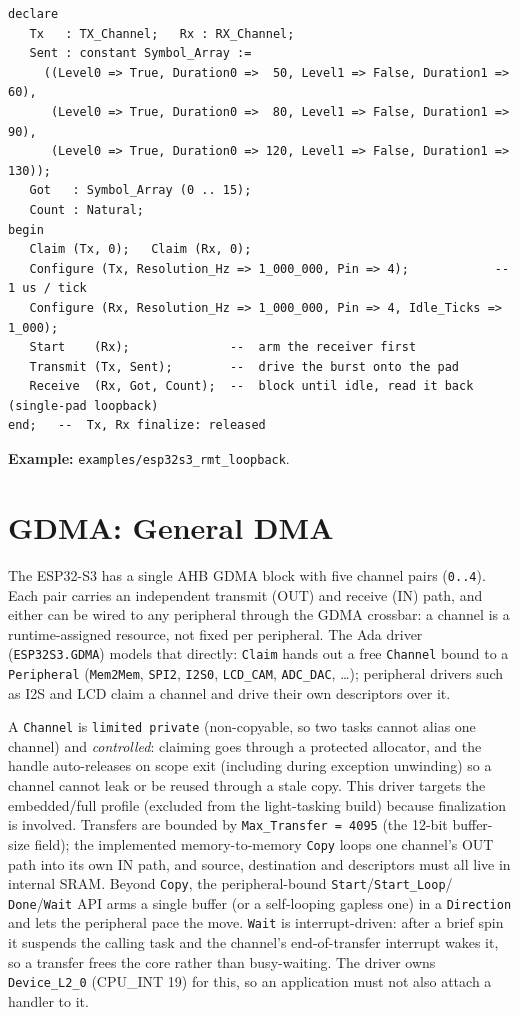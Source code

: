 \begin{lstlisting}
declare
   Tx   : TX_Channel;   Rx : RX_Channel;
   Sent : constant Symbol_Array :=
     ((Level0 => True, Duration0 =>  50, Level1 => False, Duration1 =>  60),
      (Level0 => True, Duration0 =>  80, Level1 => False, Duration1 =>  90),
      (Level0 => True, Duration0 => 120, Level1 => False, Duration1 => 130));
   Got   : Symbol_Array (0 .. 15);
   Count : Natural;
begin
   Claim (Tx, 0);   Claim (Rx, 0);
   Configure (Tx, Resolution_Hz => 1_000_000, Pin => 4);            --  1 us / tick
   Configure (Rx, Resolution_Hz => 1_000_000, Pin => 4, Idle_Ticks => 1_000);
   Start    (Rx);              --  arm the receiver first
   Transmit (Tx, Sent);        --  drive the burst onto the pad
   Receive  (Rx, Got, Count);  --  block until idle, read it back (single-pad loopback)
end;   --  Tx, Rx finalize: released
\end{lstlisting}

\noindent\textbf{Example:} \texttt{examples/esp32s3\_rmt\_loopback}.

\section{GDMA: General DMA}
\label{app:int:gdma}

The ESP32-S3 has a single AHB GDMA block with five channel pairs (\texttt{0..4}).
Each pair carries an independent transmit (OUT) and receive (IN) path, and either
can be wired to any peripheral through the GDMA crossbar: a channel is a
runtime-assigned resource, not fixed per peripheral. The Ada driver
(\texttt{ESP32S3.GDMA}) models that directly: \texttt{Claim} hands out a free
\texttt{Channel} bound to a \texttt{Peripheral} (\texttt{Mem2Mem}, \texttt{SPI2},
\texttt{I2S0}, \texttt{LCD\_CAM}, \texttt{ADC\_DAC}, \ldots); peripheral drivers
such as I2S and LCD claim a channel and drive their own descriptors over it.

A \texttt{Channel} is \texttt{limited private} (non-copyable, so two tasks
cannot alias one channel) and \emph{controlled}: claiming goes through a
protected allocator, and the handle auto-releases on scope exit (including during
exception unwinding) so a channel cannot leak or be reused through a stale copy.
This driver targets the embedded/full profile (excluded from the light-tasking
build) because finalization is involved. Transfers are bounded by
\texttt{Max\_Transfer = 4095} (the 12-bit buffer-size field); the implemented
memory-to-memory \texttt{Copy} loops one channel's OUT path into its own IN path,
and source, destination and descriptors must all live in internal SRAM. Beyond
\texttt{Copy}, the peripheral-bound \texttt{Start}/\texttt{Start\_Loop}/%
\texttt{Done}/\texttt{Wait} API arms a single buffer (or a self-looping gapless
one) in a \texttt{Direction} and lets the peripheral pace the move.
\texttt{Wait} is interrupt-driven: after a brief spin it suspends the calling
task and the channel's end-of-transfer interrupt wakes it, so a transfer frees
the core rather than busy-waiting. The driver owns \texttt{Device\_L2\_0}
(CPU\_INT 19) for this, so an application must not also attach a handler to it.

